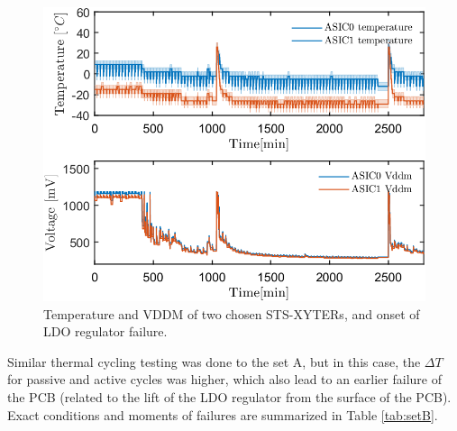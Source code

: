 \begin{figure}[!h]
\centering
\includegraphics[width=0.6\columnwidth]{Chapter4/images/temps_vddm.png}
\caption{Temperature and VDDM of two chosen STS-XYTERs, and onset of \gls{LDO} regulator failure.}
\label{fig_cold_startup_vddm}
\end{figure}

Similar thermal cycling testing was done to the set A, but in this case, the $\Delta T$ for passive and active cycles was higher, which also lead to an earlier failure of the \gls{PCB} (related to the lift of the \gls{LDO} regulator from the surface of the \gls{PCB}). Exact conditions and moments of failures are summarized in Table \ref{tab:setB}.

